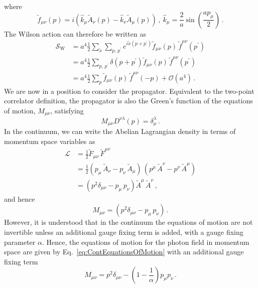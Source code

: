 %
where
%
\begin{equation}
\tilde{f}_{\mu\nu}(p) = i\left(\hat{k}_\mu \tilde{A}_\nu(p) - \hat{k}_\nu \tilde{A}_\mu(p)\right)\, ,~\hat{k}_\mu = \frac{2}{a}\sin\left(\frac{ap_\mu}{2}\right)\, .
\end{equation}
%
The Wilson action can therefore be written as
%
\begin{align}
\mathcal{S}_\text{W} &= a^4\frac{1}{2}\sum_{\tilde{x}}\sum_{p,\,p^\prime}e^{i\tilde{x}(p+p^\prime)}\tilde{f}_{\mu\nu}(p) \, \tilde{f}^{\mu\nu}(p^\prime)\nonumber\\
&=a^4\frac{1}{2}\sum_{p,\,p^\prime} \delta(p+p^\prime)\tilde{f}_{\mu\nu}(p) \, \tilde{f}^{\mu\nu}(p^\prime) \nonumber\\
&= a^4\frac{1}{2}\sum_{p}\tilde{f}_{\mu\nu}(p) \, \tilde{f}^{\mu\nu}(-p) + \mathcal{O}(a^4)\, . \label{eq:WilsonMomentum}
\end{align}
%
We are now in a position to consider the propagator. Equivalent to the two-point correlator definition, the propagator is also the Green's function of the equations of motion, $M_{\mu\nu}$, satisfying
%
\begin{equation}
M_{\mu\nu}D^{\nu\lambda}(p) = \delta_\mu^\lambda\, .
\end{equation}
%
In the continuum, we can write the Abelian Lagrangian density in terms of momentum space variables as 
%
\begin{align*}
\mathcal{L} &= \frac{1}{2}\tilde{F}_{\mu\nu}\,\tilde{F}^{\mu\nu}\\
&= \frac{1}{2}(p_\mu\,\tilde{A}_\nu - p_\nu\,\tilde{A}_\mu)\,(p^\mu\,\tilde{A}^\nu - p^\nu\,\tilde{A}^\mu)\\
&= (p^2\delta_{\mu\nu} - p_\mu\,p_\nu)\tilde{A}^\mu\,\tilde{A}^\nu\, ,
\end{align*}
%
and hence
%
\begin{equation}
M_{\mu\nu} = (p^2\delta_{\mu\nu} - p_\mu\,p_\nu)\, .
\label{eq:ContEquationsOfMotion}
\end{equation}
%
However, it is understood that in the continuum the equations of motion are not invertible unless an additional gauge fixing term is added, with a gauge fixing parameter $\alpha$. Hence, the equations of motion for the photon field in momentum space are given by Eq.~\eqref{eq:ContEquationsOfMotion} with an additional gauge fixing term~\cite{ryder1996quantum}
%
\begin{equation}
M_{\mu\nu} = p^2\delta_{\mu\nu} - \left(1-\frac{1}{\alpha}\right)p_\mu p_\nu\, .
\end{equation}
